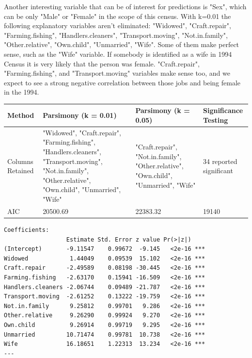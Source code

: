 \documentclass[letter]{article}
\begin{document}
Another interesting variable that can be of interest for predictions is "Sex", which can be only "Male" or "Female" in the scope of this census. With k=0.01 the following explanatory variables aren't eliminated: "Widowed", "Craft.repair", "Farming.fishing", "Handlers.cleaners", "Transport.moving", "Not.in.family", "Other.relative", "Own.child", "Unmarried", "Wife". Some of them make perfect sense, such as the "Wife" variable. If somebody is identified as a wife in 1994 Census it is very likely that the person was female. "Craft.repair", "Farming.fishing", and  "Transport.moving" variables make sense too, and we expect to see a strong negative correlation between those jobs and being female in the 1994.


\begin{center}
    \begin{tabular}{ | l |  p{4cm} |  p{4cm} | p{4cm} |}
    \hline
    Method & Parsimony (k = 0.01) & Parsimony (k = 0.05) & Significance Testing \\ \hline
    	
    Columns Retained & "Widowed", "Craft.repair", "Farming.fishing", "Handlers.cleaners", "Transport.moving", "Not.in.family", "Other.relative", "Own.child", "Unmarried", "Wife" & "Craft.repair", "Not.in.family", "Other.relative", "Own.child", "Unmarried", "Wife" & 34 reported significant\\ \hline
    
    AIC & 20500.69 & 22383.32  & 19140\\ \hline
    
    \end{tabular}
\end{center}


\begin{verbatim}
Coefficients:
                  Estimate Std. Error z value Pr(>|z|)    
(Intercept)       -9.11547    0.99672  -9.145   <2e-16 ***
Widowed            1.44049    0.09539  15.102   <2e-16 ***
Craft.repair      -2.49589    0.08198 -30.445   <2e-16 ***
Farming.fishing   -2.63170    0.15941 -16.509   <2e-16 ***
Handlers.cleaners -2.06744    0.09489 -21.787   <2e-16 ***
Transport.moving  -2.61252    0.13222 -19.759   <2e-16 ***
Not.in.family      9.25812    0.99701   9.286   <2e-16 ***
Other.relative     9.26290    0.99924   9.270   <2e-16 ***
Own.child          9.26914    0.99719   9.295   <2e-16 ***
Unmarried         10.71474    0.99781  10.738   <2e-16 ***
Wife              16.18651    1.22313  13.234   <2e-16 ***
---

\end{verbatim}
\end{document}
